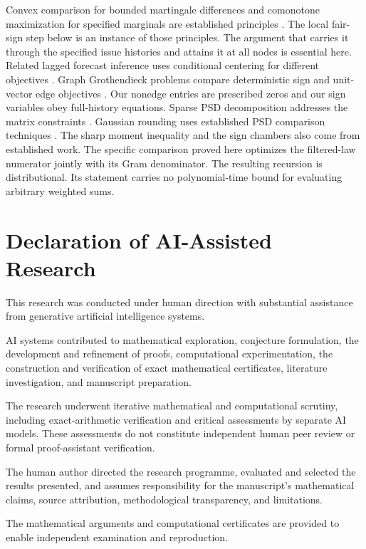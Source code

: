 \documentclass[11pt]{article}
\theoremstyle{definition}
\begin{document}
Convex comparison for bounded martingale differences and comonotone
maximization for specified marginals are established principles
\cite{bentkus,kaas,cheung,leskela}. The local fair-sign step below is
an instance of those principles. The argument that carries it through the
specified issue histories and attains it at all nodes is essential here.
Related lagged forecast inference uses conditional centering for different
objectives \cite{choe}. Graph Grothendieck problems compare deterministic
sign and unit-vector edge objectives \cite{laurent}. Our nonedge entries
are prescribed zeros and our sign variables obey full-history equations.
Sparse PSD decomposition addresses the matrix constraints
\cite{agler}. Gaussian rounding uses established PSD comparison techniques
\cite{nesterov,briet}. The sharp moment inequality and the sign chambers
also come from established work. The specific comparison proved here
optimizes the filtered-law numerator jointly with its Gram denominator.
The resulting recursion is distributional. Its statement carries no
polynomial-time bound for evaluating arbitrary weighted sums.




\appendix


{}
\section*{Declaration of AI-Assisted Research}

This research was conducted under human direction with substantial assistance from generative artificial intelligence systems.

AI systems contributed to mathematical exploration, conjecture formulation, the development and refinement of proofs, computational experimentation, the construction and verification of exact mathematical certificates, literature investigation, and manuscript preparation.

The research underwent iterative mathematical and computational scrutiny, including exact-arithmetic verification and critical assessments by separate AI models. These assessments do not constitute independent human peer review or formal proof-assistant verification.

The human author directed the research programme, evaluated and selected the results presented, and assumes responsibility for the manuscript's mathematical claims, source attribution, methodological transparency, and limitations.

The mathematical arguments and computational certificates are provided to enable independent examination and reproduction.


\begingroup
\raggedright

\endgroup
\end{document}
